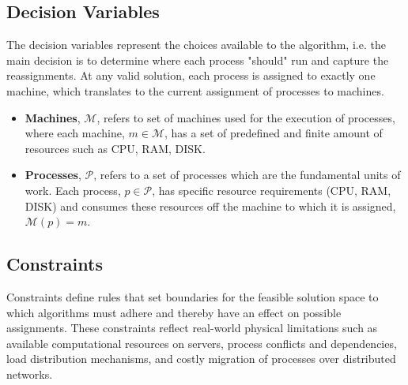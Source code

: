 \documentclass[a4paper,12pt]{Classes/RoboticsLaTeX}
\begin{document}
\subsection{Decision Variables}\label{decision-variables}

The decision variables represent the choices available to the algorithm, i.e. the main decision is to determine where each process "should" run and capture the reassignments. At any valid solution, each process is assigned to exactly one machine, which translates to the current assignment of processes to machines. 

\begin{itemize}
\item 
    \textbf{Machines}, \(\mathcal{M}\), refers to set of machines used for the execution of processes, where each machine, \(\textit{m} \in \mathcal{M}\), has a set of predefined and finite amount of resources such as CPU, RAM, DISK.
\item
    \textbf{Processes}, \(\mathcal{P}\), refers to a set of processes which are the fundamental units of work. Each process, \(\textit{p} \in \mathcal{P}\), has specific resource requirements (CPU, RAM, DISK) and consumes these resources off the machine to which it is assigned, \(\mathcal{M}(\textit{p}) = \textit{m}\).

\end{itemize}

\subsection{Constraints}\label{constraints}

Constraints define rules that set boundaries for the feasible solution space to which algorithms must adhere and thereby have an effect on possible assignments. 
These constraints reflect real-world physical limitations such as available computational resources on servers, process conflicts and dependencies, load distribution mechanisms, and costly migration of processes over distributed networks. 
\end{document}
